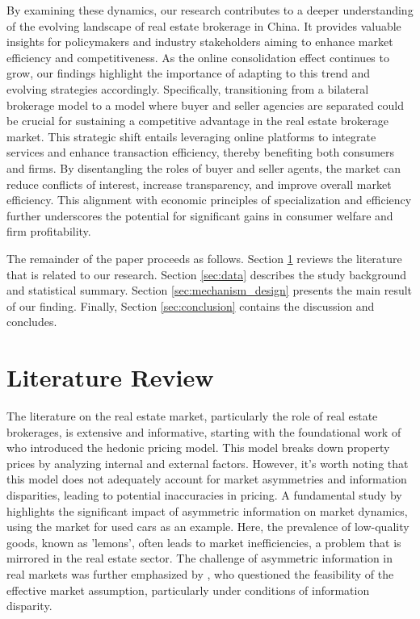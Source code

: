 \documentclass[12pt]{article}
\begin{document}
By examining these dynamics, our research contributes to a deeper understanding of the evolving landscape of real estate brokerage in China. It provides valuable insights for policymakers and industry stakeholders aiming to enhance market efficiency and competitiveness. As the online consolidation effect continues to grow, our findings highlight the importance of adapting to this trend and evolving strategies accordingly. Specifically, transitioning from a bilateral brokerage model to a model where buyer and seller agencies are separated could be crucial for sustaining a competitive advantage in the real estate brokerage market. This strategic shift entails leveraging online platforms to integrate services and enhance transaction efficiency, thereby benefiting both consumers and firms. By disentangling the roles of buyer and seller agents, the market can reduce conflicts of interest, increase transparency, and improve overall market efficiency. This alignment with economic principles of specialization and efficiency further underscores the potential for significant gains in consumer welfare and firm profitability.

The remainder of the paper proceeds as follows. Section \ref{sec:literature_review} reviews the literature that is related to our research. Section \ref{sec:data} describes the study background and statistical summary. Section \ref{sec:mechanism_design} presents the main result of our finding. Finally, Section \ref{sec:conclusion} contains the discussion and concludes.

\section{Literature Review} \label{sec:literature_review}

The literature on the real estate market, particularly the role of real estate brokerages, is extensive and informative, starting with the foundational work of \citet{Rosen_hedonic} who introduced the hedonic pricing model. This model breaks down property prices by analyzing internal and external factors. However, it's worth noting that this model does not adequately account for market asymmetries and information disparities, leading to potential inaccuracies in pricing. A fundamental study by \citep{Akerlof_1970} highlights the significant impact of asymmetric information on market dynamics, using the market for used cars as an example. Here, the prevalence of low-quality goods, known as 'lemons', often leads to market inefficiencies, a problem that is mirrored in the real estate sector. The challenge of asymmetric information in real markets was further emphasized by \citet{grossman_impossibility_1980}, who questioned the feasibility of the effective market assumption, particularly under conditions of information disparity.
\end{document}
